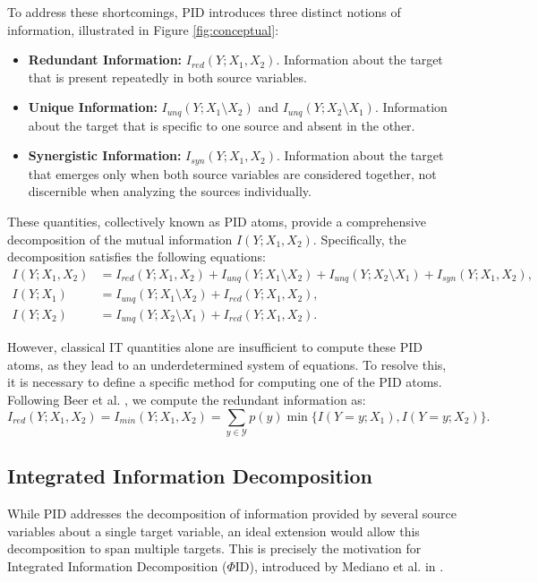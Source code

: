 \documentclass[11pt,a4paper]{ouparticle}
\begin{document}
To address these shortcomings, PID introduces three distinct notions of information, illustrated in Figure \ref{fig:conceptual}:
\begin{itemize}
    \item \textbf{Redundant Information:} $I_{red}(Y;X_1, X_2)$. Information about the target that is present repeatedly in both source variables.
    \item \textbf{Unique Information:} $I_{unq}(Y;X_1 \setminus X_2)$ and $I_{unq}(Y;X_2 \setminus X_1)$. Information about the target that is specific to one source and absent in the other.
    \item \textbf{Synergistic Information:} $I_{syn}(Y;X_1, X_2)$. Information about the target that emerges only when both source variables are considered together, not discernible when analyzing the sources individually.
\end{itemize}


These quantities, collectively known as PID atoms, provide a comprehensive decomposition of the mutual information $I(Y; X_1, X_2)$. Specifically, the decomposition satisfies the following equations:
\begin{align*}
     I(Y; X_1, X_2) &= I_{red}(Y;X_1, X_2) + I_{unq}(Y;X_1\setminus X_2)+ I_{unq}(Y;X_2\setminus X_1) + I_{syn}(Y;X_1, X_2), \\
     I(Y; X_1) &= I_{unq}(Y;X_1\setminus X_2)+ I_{red}(Y;X_1, X_2),  \\ 
     I(Y; X_2) &= I_{unq}(Y;X_2\setminus X_1)+ I_{red}(Y;X_1, X_2). 
\end{align*}

However, classical IT quantities alone are insufficient to compute these PID atoms, as they lead to an underdetermined system of equations. To resolve this, it is necessary to define a specific method for computing one of the PID atoms. Following Beer et al. \cite{pid2010beer}, we compute the redundant information as:
\begin{equation*}
    I_{red}(Y; X_1, X_2) = I_{min}(Y; X_1, X_2) = \sum_{y\in \mathcal{Y}} p(y) \min\{ I(Y=y; X_1), I(Y=y; X_2)\}.
\end{equation*}


\subsection*{Integrated Information Decomposition}

While PID addresses the decomposition of information provided by several source variables about a single target variable, an ideal extension would allow this decomposition to span multiple targets. This is precisely the motivation for Integrated Information Decomposition ($\Phi$ID), introduced by Mediano et al. in \cite{phid2021}.
\end{document}
